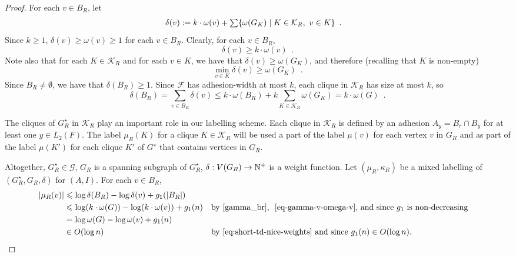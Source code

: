\documentclass{patmorin}
\let\eqref\cref
\renewcommand{\ge}{\geqslant}
\renewcommand{\le}{\leqslant}
\renewcommand{\geq}{\geqslant}
\newcommand{\Oh}{O}
\DeclarePairedDelimiter{\set}{\{}{\}}
\begin{document}
\begin{proof}
  For each $v\in B_R$, let
  \begin{align*}
    \delta(v)
     & :=k\cdot\omega(v)+\textstyle\sum\set{\omega(G_K)\mid K\in\mathcal{K}_R,\ v\in K} \enspace .
  \end{align*}
  Since $k\geq1$, $\delta(v)\geq\omega(v)\geq 1$ for each $v\in B_R$.
  Clearly, for each $v\in B_R$,
  \begin{equation}
    \label{eq-gamma-v-omega-v}
    \delta(v) \geq k\cdot\omega(v)\enspace.
  \end{equation}
  Note also that for each $K\in\mathcal{K}_R$ and for each $v\in K$, we have that $\delta(v)\ge \omega(G_K)$, and therefore (recalling that $K$ is non-empty)
  \begin{equation}
    \min_{v\in K}\delta(v) \ge \omega(G_K) \enspace . \label{gamma_v_lower_bound}
  \end{equation}
  Since $B_R\neq\emptyset$, we have that $\delta(B_R)\geq1$.
  Since $\mathcal{F}$ has adhesion-width at most $k$, each clique in $\mathcal{K}_R$ has size at most $k$, so
  \begin{equation}
    \delta(B_R)=\sum_{v\in B_R}\delta(v)
    \le k\cdot\omega(B_R) + k\sum_{K\in\mathcal{K}_R}\omega(G_K)
    = k\cdot\omega(G)  \enspace . \label{gamma_br}
  \end{equation}

  The cliques of $G^\star_R$ in $\mathcal{K}_R$ play an important role in our labelling scheme.
  Each clique in $\mathcal{K}_R$ is defined by an adhesion $A_y=B_r\cap B_y$ for at least one $y\in L_2(F)$.  The label $\mu_R(K)$ for a clique $K\in\mathcal{K}_R$ will be used a part of the label $\mu(v)$ for each vertex $v$ in $G_R$ and as part of the label $\mu(K')$ for each clique $K'$ of $G^\star$ that contains vertices in $G_R$.

  Altogether, $G^\star_R\in\mathcal{G}$, $G_R$ is a spanning subgraph of $G^\star_R$, $\delta:V(G_R)\to\mathbb{N}^+$ is a weight function. Let $(\mu_R,\kappa_R)$ be a mixed labelling of $(G^\star_R, G_R, \delta)$ for $(A, I)$. For each $v\in B_R$,
  \begin{align}
    |\mu_R(v)|
     & \le \log \delta(B_R)-\log\delta(v)+g_1(|B_R|)\notag                                                                                                                              \\
     & \le \log (k\cdot\omega(G)) - \log (k\cdot\omega(v)) + g_1(n)             &  & \textrm{by~\eqref{gamma_br}, ~\eqref{eq-gamma-v-omega-v}, and since $g_1$ is non-decreasing}\notag \\
     & = \log\omega(G) - \log\omega(v) + g_1(n)\label{eq:mu-R-bounded-in-omega}                                                                                                         \\
     & \in\Oh(\log n)                                                           &  & \textrm{by~\eqref{eq:short-td-nice-weights} and since $g_1(n)\in\Oh(\log n)$.}
    \label{eq:mu-R-in-logn}
  \end{align}


\end{proof}
\end{document}
